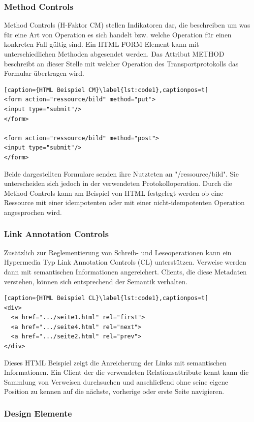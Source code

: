 \subsubsection{Method Controls}
Method Controls (H-Faktor CM) stellen Indikatoren dar, die beschreiben um was für eine Art von Operation es sich handelt bzw. welche Operation für einen konkreten Fall gültig sind. Ein HTML FORM-Element kann mit unterschiedlichen Methoden abgesendet werden. Das Attribut METHOD beschreibt an dieser Stelle mit welcher Operation des Transportprotokolls das Formular übertragen wird.\\
\begin{lstlisting}[caption={HTML Beispiel CM}\label{lst:code1},captionpos=t]
<form action="ressource/bild" method="put">
<input type="submit"/>
</form>

<form action="ressource/bild" method="post">
<input type="submit"/>
</form>
\end{lstlisting}
Beide dargestellten Formulare senden ihre Nutzteten an "/ressource/bild". Sie unterscheiden sich jedoch in der verwendeten Protokolloperation. Durch die Method Controls kann am Beispiel von HTML festgelegt werden ob eine Ressource mit einer idempotenten oder mit einer nicht-idempotenten Operation angesprochen wird.



\subsubsection{Link Annotation Controls}
Zusätzlich zur Reglementierung von Schreib- und Leseoperationen kann ein Hypermedia Typ Link Annotation Controls (CL) unterstützen. Verweise werden dann mit semantischen Informationen angereichert. Clients, die diese Metadaten verstehen, können sich entsprechend der Semantik verhalten.
\begin{lstlisting}[caption={HTML Beispiel CL}\label{lst:code1},captionpos=t]
<div>
  <a href=".../seite1.html" rel="first">
  <a href=".../seite4.html" rel="next">
  <a href=".../seite2.html" rel="prev">
</div>
\end{lstlisting}
Dieses HTML Beispiel zeigt die Anreicherung der Links mit semantischen Informationen. Ein Client der die verwendeten Relationsattribute kennt kann die Sammlung von Verweisen durchsuchen und anschließend ohne seine eigene Position zu kennen auf die nächste, vorherige oder erste Seite navigieren. 



\subsubsection{Design Elemente}

